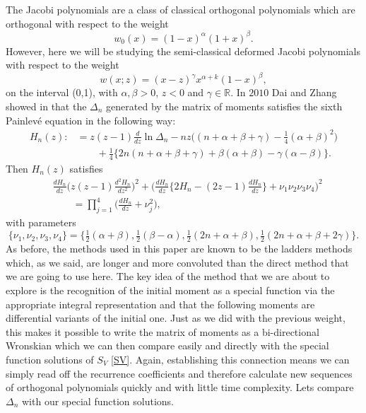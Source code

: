 \documentclass[12pt]{article}
\def\P{Painlev\'e }
\def\R{\mathbb{R}}
\numberwithin{figure}{section}
\numberwithin{equation}{section}
\numberwithin{table}{section}
\begin{document}
The Jacobi polynomials are a class of classical orthogonal polynomials which are orthogonal with respect to the weight
$$w_0(x)=(1-x)^\alpha(1+x)^\beta.$$
However, here we will be studying the semi-classical deformed Jacobi polynomials with respect to the weight
\begin{equation}
w(x;z)=(x-z)^\gamma x^{\alpha+k}(1-x)^\beta,\label{jacweight5}
\end{equation}
on the interval (0,1), with $\alpha, \beta>0$, $z<0$ and $\gamma\in\R$.
In $2010$ Dai and Zhang showed in \cite{P:43:055207} that the $\Delta_n$ generated by the matrix of moments satisfies the sixth \P equation in the following way:
\begin{align*}
H_n(z):&=z(z-1)\frac{d}{dz}\ln \Delta_n -nz\big((n+\alpha+\beta+\gamma)-\tfrac{1}{4}(\alpha+\beta)^2\big)\\
&\qquad+\tfrac{1}{4}\big\{2n(n+\alpha+\beta+\gamma)+\beta(\alpha+\beta)-\gamma(\alpha-\beta)\big\}.
\end{align*}
Then $H_n(z)$ satisfies
\begin{align*}
&\frac{dH_n}{dz}\bigg(z(z-1)\frac{d^2H_n}{dz^2}\bigg)^2+\bigg(\frac{dH_n}{dz}\bigg\{2H_n-(2z-1)\frac{dH_n}{dz}\bigg\}+\nu_1\nu_2\nu_3\nu_4\bigg)^2\\
&\qquad=\prod^4_{j=1}\bigg(\frac{dH_n}{dz}+\nu_j^2\bigg),
\end{align*}
with parameters
\begin{equation*}
\{\nu_1,\nu_2,\nu_3,\nu_4\}=\{\tfrac{1}{2}(\alpha+\beta),\tfrac{1}{2}(\beta-\alpha),\tfrac{1}{2}(2n+\alpha+\beta),\tfrac{1}{2}(2n+\alpha+\beta+2\gamma)\}.
\end{equation*}
As before, the methods used in this paper are known to be the ladders methods which, as we said, are longer and more convoluted than the direct method that we are going to use here. The key idea of the method that we are about to explore is the recognition of the initial moment as a special function via the appropriate integral representation and that the following moments are differential variants of the initial one. Just as we did with the previous weight, this makes it possible to write the matrix of moments as a bi-directional Wronskian which we can then compare easily and directly with the special function solutions of $S_V$ \eqref{SV}. Again, establishing this connection means we can simply read off the recurrence coefficients and therefore calculate new sequences of orthogonal polynomials quickly and with little time complexity.
Lets compare $\Delta_n$ with our special function solutions.
\end{document}

